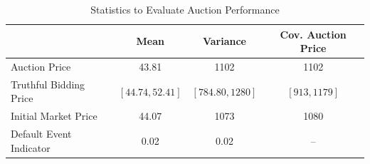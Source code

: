 \begin{table}[htbp]
\centering
\caption{Statistics to Evaluate Auction Performance}
\label{tab:performance}
\begin{tabular}{lccc}
\hline\hline
 & Mean & Variance & Cov. Auction Price \\
\hline
Auction Price & 43.81 & 1102 & 1102 \\
Truthful Bidding Price & $[44.74, 52.41]$ & $[784.80, 1280]$ & $[913, 1179]$ \\
Initial Market Price & 44.07 & 1073 & 1080 \\
Default Event Indicator & 0.02 & 0.02 & -- \\
\hline\hline
\end{tabular}
\end{table}
